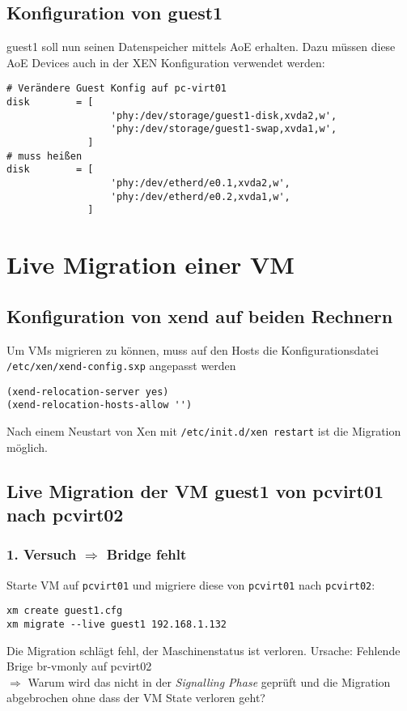 \section{Konfiguration von guest1}
guest1 soll nun seinen Datenspeicher mittels AoE erhalten. Dazu müssen diese AoE Devices auch in der XEN Konfiguration verwendet werden:
\setupVerbatimOut
\begin{verbatim}
# Verändere Guest Konfig auf pc-virt01
disk        = [
                  'phy:/dev/storage/guest1-disk,xvda2,w',
                  'phy:/dev/storage/guest1-swap,xvda1,w',
              ]
# muss heißen
disk        = [
                  'phy:/dev/etherd/e0.1,xvda2,w',
                  'phy:/dev/etherd/e0.2,xvda1,w',
              ]
\end{verbatim}

\chapter{Live Migration einer VM}

\section{Konfiguration von xend auf beiden Rechnern}
Um VMs migrieren zu können, muss auf den Hosts die Konfigurationsdatei \verb#/etc/xen/xend-config.sxp# angepasst werden
\setupVerbatimOut
\begin{verbatim}
(xend-relocation-server yes)
(xend-relocation-hosts-allow '')
\end{verbatim} 
Nach einem Neustart von Xen mit \verb#/etc/init.d/xen restart# ist die Migration möglich. 

\section{Live Migration der VM guest1 von pcvirt01 nach pcvirt02}
\subsection{1. Versuch $\Rightarrow$ Bridge fehlt}
Starte VM auf \verb#pcvirt01# und migriere diese von \verb#pcvirt01# nach \verb#pcvirt02#:
\setupVerbatimOut
\begin{verbatim}
xm create guest1.cfg
xm migrate --live guest1 192.168.1.132
\end{verbatim}

Die Migration schlägt fehl, der Maschinenstatus ist verloren. Ursache: Fehlende Brige br-vmonly auf pcvirt02
\\
$\Rightarrow$ Warum wird das nicht in der \emph{Signalling Phase} geprüft und die Migration abgebrochen ohne dass der VM State verloren geht? 

